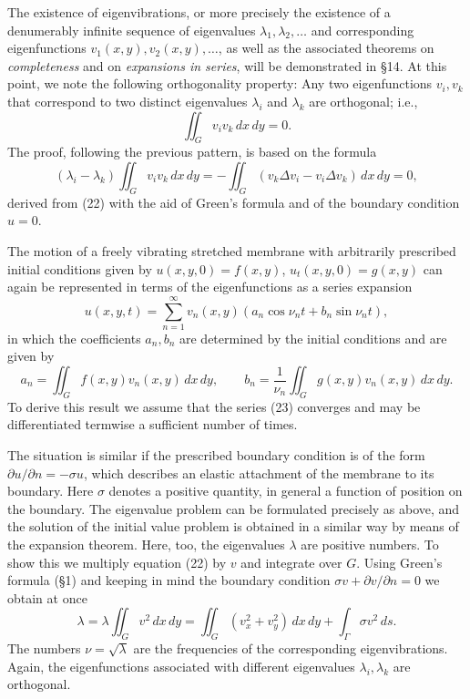 The existence of eigenvibrations, or more precisely the existence of a denumerably infinite sequence of eigenvalues $\lambda_1,\lambda_2,\ldots$ and corresponding eigenfunctions $v_1(x,y),v_2(x,y),\ldots$, as well as the associated theorems on \emph{completeness} and on \emph{expansions in series}, will be demonstrated in \S14. At this point, we note the following orthogonality property: Any two eigenfunctions $v_i,v_k$ that correspond to two distinct eigenvalues $\lambda_i$ and $\lambda_k$ are orthogonal; i.e.,
\[
\iint_Gv_iv_k\,dx\,dy=0.
\]
The proof, following the previous pattern, is based on the formula
\[
(\lambda_i-\lambda_k)\iint_Gv_iv_k\,dx\,dy
=-\iint_G(v_k\Delta v_i-v_i\Delta v_k)\,dx\,dy=0,
\]
derived from (22) with the aid of Green's formula and of the boundary condition $u=0$.

The motion of a freely vibrating stretched membrane with arbitrarily prescribed initial conditions given by $u(x,y,0)=f(x,y)$, $u_t(x,y,0)=g(x,y)$ can again be represented in terms of the eigenfunctions as a series expansion
\begin{equation}\tag{23}
u(x,y,t)=\sum_{n=1}^\infty v_n(x,y)(a_n\cos\nu_nt+b_n\sin\nu_nt),
\end{equation}
in which the coefficients $a_n,b_n$ are determined by the initial conditions and are given by
\[
a_n=\iint_Gf(x,y)v_n(x,y)\,dx\,dy,
\qquad
b_n=\frac1{\nu_n}\iint_Gg(x,y)v_n(x,y)\,dx\,dy.
\]
To derive this result we assume that the series (23) converges and may be differentiated termwise a sufficient number of times.

The situation is similar if the prescribed boundary condition is of the form $\partial u/\partial n=-\sigma u$, which describes an elastic attachment of the membrane to its boundary. Here $\sigma$ denotes a positive quantity, in general a function of position on the boundary. The eigenvalue problem can be formulated precisely as above, and the solution of the initial value problem is obtained in a similar way by means of the expansion theorem. Here, too, the eigenvalues $\lambda$ are positive numbers. To show this we multiply equation (22) by $v$ and integrate over $G$. Using Green's formula (\S1) and keeping in mind the boundary condition $\sigma v+\partial v/\partial n=0$ we obtain at once
\[
\lambda=\lambda\iint_Gv^2\,dx\,dy
=\iint_G(v_x^2+v_y^2)\,dx\,dy+\int_\Gamma\sigma v^2\,ds.
\]
The numbers $\nu=\sqrt\lambda$ are the frequencies of the corresponding eigenvibrations. Again, the eigenfunctions associated with different eigenvalues $\lambda_i,\lambda_k$ are orthogonal.

